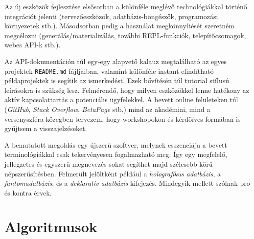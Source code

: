 \documentclass[
    parspace,
    noindent,
    nohyp,
]{elteiktdk}[2023/04/10]
\begin{document}
Az új eszközök fejlesztése elsősorban a különféle meglévő technológiákkal történő integrációt jelenti
(tervezőeszközök, adatbázis-böngészők, programozási környezetek stb.).
Másodsorban pedig a használat megkönnyítését szeretném megcélozni
(generálás/materializálás, további REPL-funkciók, telepítőcsomagok, webes API-k stb.).

Az API-dokumentáción túl egy-egy alapvető kalauz megtalálható
az egyes projektek \texttt{README.md} fájljaiban,
valamint különféle instant elindítható példaprojektek is segítik az ismerkedést.
Ezek bővítésén túl tutorial stílusú leírásokra is szükség lesz.
Felmérendő, hogy milyen eszközökkel lenne hatékony az aktív kapcsolattartás a potenciális ügyfelekkel.
A bevett online felületeken túl (\textit{GitHub}, \textit{Stack Overflow}, \textit{BetaPage} stb.)
mind az akadémiai, mind a versenyszféra-közegben tervezem,
hogy workshopokon és kérdőíves formában is gyűjtsem a visszajelzéseket.

A bemutatott megoldás egy újszerű szoftver,
melynek esszenciája a bevett terminológiákkal csak tekervényesen fogalmazható meg.
Így egy megfelelő, jellegzetes és egyszerű megnevezés
sokat segíthet majd szélesebb körű népszerűsítésben.
Felmerült jelöltként például
a \textit{holografikus adatbázis},
a \textit{fantomadatbázis},
és a \textit{deklaratív adatbázis} kifejezés.
Mindegyik mellett szólnak pro és kontra érvek.

\pagebreak


{}
\begin{spacing}{1.15}
\printbibliography[title=\biblabel]
\end{spacing}
\cleardoublepage


\appendix

\chapter{Algoritmusok}

{}
\end{document}
